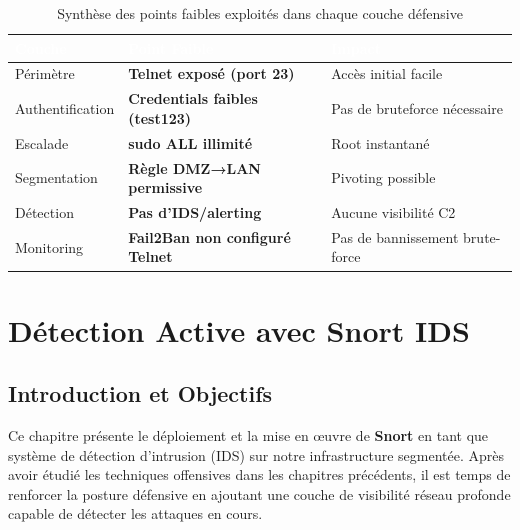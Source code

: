 \documentclass[12pt,a4paper,openany]{report}
\begin{document}
\begin{table}[H]
	\centering
	\small
	\renewcommand{\arraystretch}{1.8}
	\setlength{\tabcolsep}{10pt}
	\setlength{\arrayrulewidth}{0.8pt}
	\begin{tabularx}{\textwidth}{|p{2.8cm}|>{\bfseries}p{3.5cm}|X|}
		\arrayrulecolor{tableborder}
		\hline
		\rowcolor{tableheadbg}
		\textcolor{white}{\textbf{Couche}}       &
		\textcolor{white}{\textbf{Point Faible}} &
		\textcolor{white}{\textbf{Impact}} \\
		\hline
		\rowcolor{tablerowalt}
		Périmètre        & Telnet exposé (port 23)       & Accès initial facile \\
		\hline
		Authentification & Credentials faibles (test123) & Pas de bruteforce nécessaire \\
		\hline
		\rowcolor{tablerowalt}
		Escalade         & sudo ALL illimité             & Root instantané \\
		\hline
		Segmentation     & Règle DMZ→LAN permissive      & Pivoting possible \\
		\hline
		\rowcolor{tablerowalt}
		Détection        & Pas d'IDS/alerting            & Aucune visibilité C2 \\
		\hline
		Monitoring       & Fail2Ban non configuré Telnet & Pas de bannissement brute-force \\
		\hline
	\end{tabularx}
	\caption{Synthèse des points faibles exploités dans chaque couche défensive}
	\label{tab:weaknesses-exploited}
\end{table}


\chapter{Détection Active avec Snort IDS}
\label{chap:snort}

\section{Introduction et Objectifs}

Ce chapitre présente le déploiement et la mise en œuvre de \textbf{Snort} en tant que système de détection
d'intrusion (IDS) sur notre infrastructure segmentée. Après avoir étudié les techniques offensives dans
les chapitres précédents, il est temps de renforcer la posture défensive en ajoutant une couche de
visibilité réseau profonde capable de détecter les attaques en cours.
\end{document}
